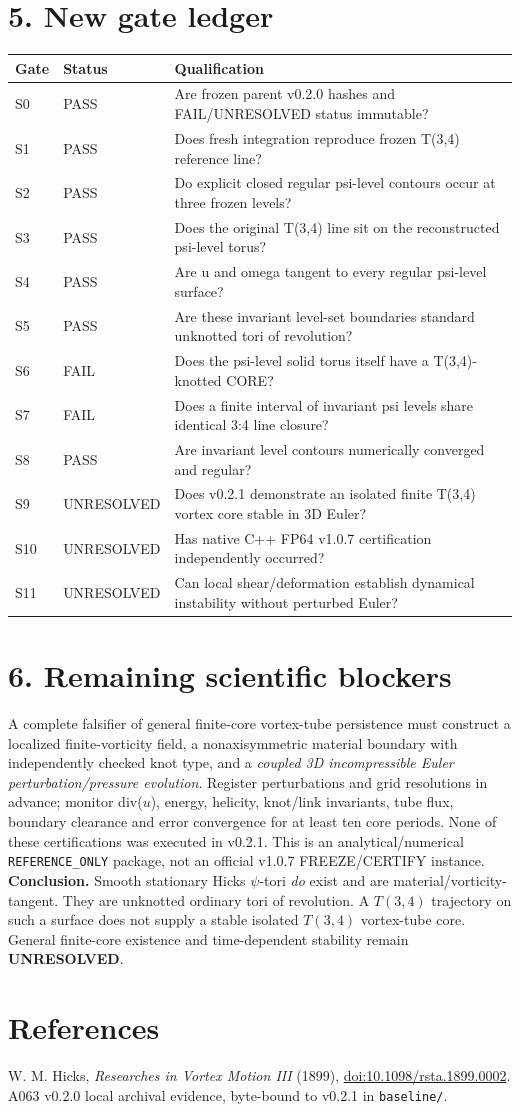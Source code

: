 \documentclass[10pt,a4paper]{article}
\begin{document}
\section*{5. New gate ledger}
\small\begin{longtable}{p{.07\linewidth}p{.14\linewidth}p{.69\linewidth}}\toprule
Gate & Status & Qualification \\\midrule
S0 & PASS & Are frozen parent v0.2.0 hashes and FAIL/UNRESOLVED status immutable? \\
S1 & PASS & Does fresh integration reproduce frozen T(3,4) reference line? \\
S2 & PASS & Do explicit closed regular psi-level contours occur at three frozen levels? \\
S3 & PASS & Does the original T(3,4) line sit on the reconstructed psi-level torus? \\
S4 & PASS & Are u and omega tangent to every regular psi-level surface? \\
S5 & PASS & Are these invariant level-set boundaries standard unknotted tori of revolution? \\
S6 & FAIL & Does the psi-level solid torus itself have a T(3,4)-knotted CORE? \\
S7 & FAIL & Does a finite interval of invariant psi levels share identical 3:4 line closure? \\
S8 & PASS & Are invariant level contours numerically converged and regular? \\
S9 & UNRESOLVED & Does v0.2.1 demonstrate an isolated finite T(3,4) vortex core stable in 3D Euler? \\
S10 & UNRESOLVED & Has native C++ FP64 v1.0.7 certification independently occurred? \\
S11 & UNRESOLVED & Can local shear/deformation establish dynamical instability without perturbed Euler? \\
\bottomrule\end{longtable}\normalsize
\section*{6. Remaining scientific blockers}
A complete falsifier of general finite-core vortex-tube persistence must construct a localized finite-vorticity field, a nonaxisymmetric material boundary with independently checked knot type, and a \emph{coupled 3D incompressible Euler perturbation/pressure evolution}. Register perturbations and grid resolutions in advance; monitor div($u$), energy, helicity, knot/link invariants, tube flux, boundary clearance and error convergence for at least ten core periods. None of these certifications was executed in v0.2.1. This is an analytical/numerical \texttt{REFERENCE\_ONLY} package, not an official v1.0.7 FREEZE/CERTIFY instance.
\textbf{Conclusion.} Smooth stationary Hicks $\psi$-tori \emph{do} exist and are material/vorticity-tangent. They are unknotted ordinary tori of revolution. A $T(3,4)$ trajectory on such a surface does not supply a stable isolated $T(3,4)$ vortex-tube core. General finite-core existence and time-dependent stability remain \textbf{UNRESOLVED}.
\section*{References}
W. M. Hicks, \emph{Researches in Vortex Motion III} (1899), \href{https://doi.org/10.1098/rsta.1899.0002}{doi:10.1098/rsta.1899.0002}. A063 v0.2.0 local archival evidence, byte-bound to v0.2.1 in \texttt{baseline/}.
\end{document}
